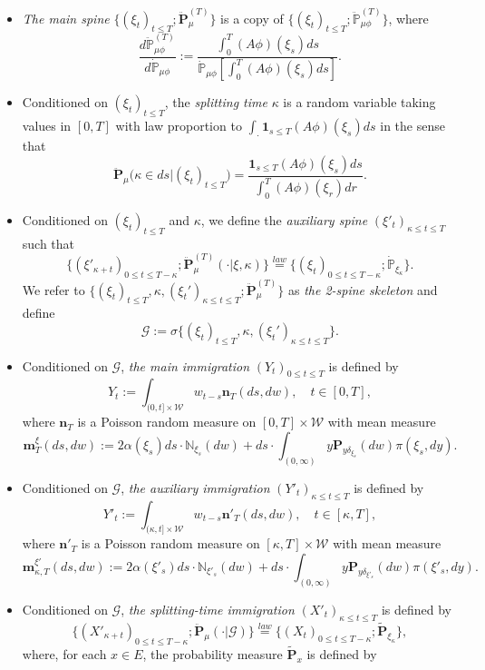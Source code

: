 \begin{itemize}
\item
	\emph{The main spine} $\{(\xi_t)_{t\leq T}; \ddot{\mathbf P}_\mu^{(T)}\}$ is a copy of $\{(\xi_t)_{t\leq T}; \ddot{\mathbb P}_{\mu\phi}^{(T)}\}$, where
\begin{equation}\label{eq:definition-of-main-spine}
	\frac {d \ddot{\mathbb P}_{\mu\phi}^{(T)}} {d \dot{\mathbb P}_{\mu\phi}}
	:= \frac{\int_0^T (A \phi)(\xi_s) ds}{\dot{\mathbb P}_{\mu\phi}[ \int_0^T (A \phi)(\xi_s) ds]}.
\end{equation}
\item
	Conditioned on $(\xi_t)_{t \leq T}$, the \emph{splitting time} $\kappa$ is a random variable taking values in $[0,T]$ with law proportion to $\int_\cdot \mathbf 1_{s\leq T} (A \phi)(\xi_s) ds$ in the sense that
\[
	\ddot{\mathbf P}_\mu\big(\kappa \in ds\big|(\xi_t)_{t\leq T}\big)
	=\frac {\mathbf 1_{s\leq T} (A\phi)(\xi_s) ds} {\int_0^T (A\phi)(\xi_r) dr}.
\]
\item
	Conditioned on $(\xi_t)_{t \leq T}$ and $\kappa$, we define the \emph{auxiliary spine} $(\xi'_t)_{\kappa \leq t \leq T}$ such that
\begin{equation}\label{eq:defAuxilSpin}
	\{(\xi'_{\kappa+t})_{0 \leq t \leq T - \kappa}; \ddot{\mathbf P}_\mu^{(T)}(\cdot | \xi,\kappa) \}
	\overset{law}{=} \{(\xi_t)_{0 \leq t \leq T - \kappa}; \dot{\mathbb P}_{\xi_\kappa} \}.
\end{equation}
	We refer to $\{(\xi_t)_{t\leq T}, \kappa, (\xi_t')_{\kappa \leq t\leq T}; \ddot {\mathbf P}_\mu^{(T)}\}$ as \emph{the 2-spine skeleton} and define
\[
	\mathscr G
	:= \sigma \{ (\xi_t)_{t \leq T}, \kappa, (\xi_t')_{\kappa \leq t \leq T} \}.
\]
\item
	Conditioned on $\mathscr G$, \emph{the main immigration} $(Y_t)_{0 \leq t\leq T}$ is defined by
\[
	Y_t
	:= \int_{(0,t] \times \mathcal W} w_{t-s} \mathbf n_T(ds, dw),
	\quad t\in [0,T],
\]
	where $\mathbf n_T$ is a
	Poisson random measure on $[0,T] \times \mathcal W$ with mean measure
\[
	\mathbf m_T^\xi (ds,dw)
	:= 2 \alpha(\xi_s) ds \cdot \mathbb N_{\xi_s}(dw) + ds \cdot \int_{(0,\infty)} y \mathbf P_{y\delta_{\xi_s}}(dw) \pi(\xi_s,dy).
\]
\item
	Conditioned on $\mathscr G$, \emph{the auxiliary immigration} $(Y'_t)_{\kappa \leq t \leq T}$ is defined by
\[
	Y'_t
	:= \int_{(\kappa,t] \times \mathcal W} w_{t-s} \mathbf n'_T(ds,dw),
	\quad t \in [\kappa,T],
\]
	where $\mathbf n'_T$ is a
	Poisson random measure on $[\kappa,T] \times \mathcal W$ with mean measure
\[
	\mathbf m^{\xi'}_{\kappa,T}(ds,dw)
	:= 2 \alpha(\xi'_s)ds \cdot \mathbb N_{\xi'_s}(dw) + ds \cdot \int_{(0,\infty)} y \mathbf P_{y\delta_{\xi'_s}}(dw) \pi(\xi'_s,dy).
\]
\item
	Conditioned on $\mathscr G$, \emph{the splitting-time immigration}
$(X'_t)_{\kappa \leq t \leq T}$ is defined by
\[
	\{(X'_{\kappa+t})_{0\leq t\leq T-\kappa}; \ddot{\mathbf P}_\mu(\cdot | \mathscr G)\}
	\overset{law}{=} \{(X_t)_{0 \leq t \leq T-\kappa}; \widetilde{\mathbf P}_{\xi_\kappa}\},
\]
where, for each $x\in E$, the probability measure $\widetilde{\mathbf P}_{x}$ is defined by


\end{itemize}

